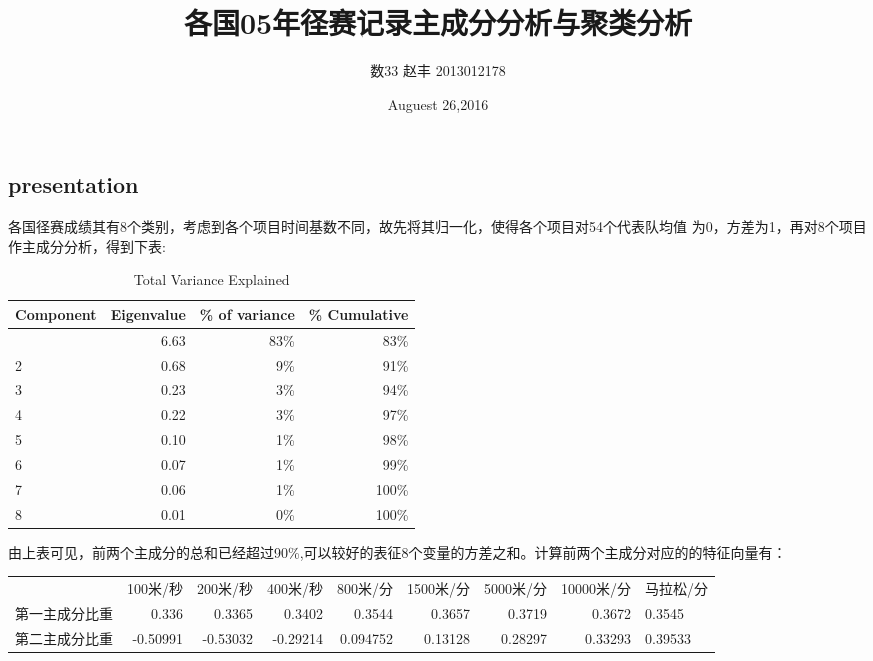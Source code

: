 \documentclass[10pt]{article}
\begin{document}
\begin{CJK}{GBK}{song}
\title{各国05年径赛记录主成分分析与聚类分析} %
\author{数33 赵丰 2013012178}
\date{Auguest 26,2016}
\maketitle
\section{presentation}
\setlength{\parindent}{2em}
各国径赛成绩其有8个类别，考虑到各个项目时间基数不同，故先将其归一化，使得各个项目对54个代表队均值
为0，方差为1，再对8个项目作主成分分析，得到下表:
\begin{table}[htbp]
  \centering
  \caption{Total Variance Explained}
    \begin{tabular}{lrrr}
    \hline
 \bfseries   Component &  \bfseries Eigenvalue  &  \bfseries \% of variance &  \bfseries \% Cumulative  \\
 \hline
 \normalfont   1     & 6.63  & 83\%  & 83\% \\
    2     & 0.68  & 9\%   & 91\% \\
    3     & 0.23  & 3\%   & 94\% \\
    4     & 0.22  & 3\%   & 97\% \\
    5     & 0.10  & 1\%   & 98\% \\
    6     & 0.07  & 1\%   & 99\% \\
    7     & 0.06  & 1\%   & 100\% \\
    8     & 0.01  & 0\%   & 100\% \\
    \hline
    \end{tabular}%
  \label{MyLabel}%
\end{table}%

由上表可见，前两个主成分的总和已经超过90\%,可以较好的表征8个变量的方差之和。计算前两个主成分对应的的特征向量有：
\begin{table}[htbp]
  \centering
     \begin{tabular}{lrrrrrrrl}
          & \multicolumn{1}{l}{100米/秒} & \multicolumn{1}{l}{200米/秒} & \multicolumn{1}{l}{400米/秒} & \multicolumn{1}{l}{800米/分} & \multicolumn{1}{l}{1500米/分} & \multicolumn{1}{l}{5000米/分} & \multicolumn{1}{l}{10000米/分} & \multicolumn{1}{l}{马拉松/分} \\
    第一主成分比重 & 0.336 & 0.3365 & 0.3402 & 0.3544 & 0.3657 & 0.3719 & 0.3672 & 0.3545\\
    第二主成分比重 & -0.50991 & -0.53032 & -0.29214 & 0.094752 & 0.13128 & 0.28297 & 0.33293 & 0.39533\\
    \end{tabular}%
  \label{tab:addlabel}%
\end{table}%


\end{CJK}
\end{document}
